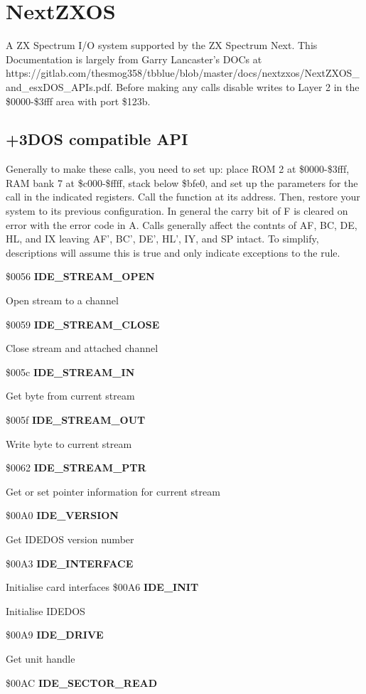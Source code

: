 \section{NextZXOS}
A ZX Spectrum I/O system supported by the ZX Spectrum Next. This
Documentation is largely from Garry Lancaster's DOCs at
https://gitlab.com/thesmog358/tbblue/blob/master/docs/nextzxos/NextZXOS\_and\_esxDOS\_APIs.pdf. Before
making any calls disable writes to Layer 2 in the \$0000-\$3fff area with port \$123b.

\subsection{+3DOS compatible API}
Generally to make these calls, you need to set up: place ROM 2 at
\$0000-\$3fff, RAM bank 7 at \$c000-\$ffff, stack below \$bfe0, and
set up the parameters for the call in the indicated registers. Call
the function at its address. Then, restore your system to its previous
configuration. In general the carry bit of F is cleared on error with
the error code in A. Calls generally affect the contnts of AF, BC, DE,
HL, and IX leaving AF', BC', DE', HL', IY, and SP intact. To simplify,
descriptions will assume this is true and only indicate exceptions to
the rule.

\$0056 \textbf{IDE\_STREAM\_OPEN}

Open stream to a channel

\$0059 \textbf{IDE\_STREAM\_CLOSE}

Close stream and attached channel

\$005c \textbf{IDE\_STREAM\_IN}

Get byte from current stream

\$005f \textbf{IDE\_STREAM\_OUT}

Write byte to current stream

\$0062 \textbf{IDE\_STREAM\_PTR}

Get or set pointer information for current stream

\$00A0 \textbf{IDE\_VERSION}

Get IDEDOS version number

\$00A3 \textbf{IDE\_INTERFACE}

Initialise card interfaces
\$00A6 \textbf{IDE\_INIT}

Initialise IDEDOS

\$00A9 \textbf{IDE\_DRIVE}

Get unit handle

\$00AC \textbf{IDE\_SECTOR\_READ}

